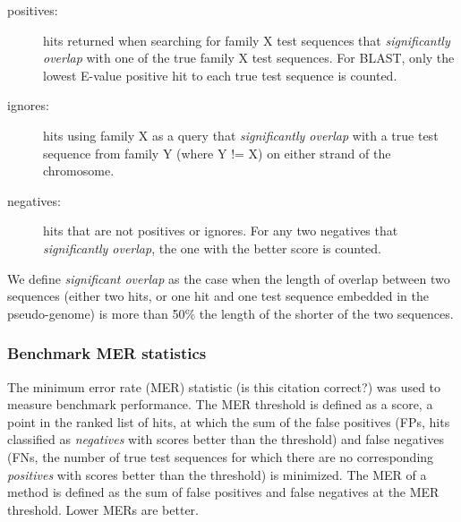 \documentclass[11pt]{article}
\begin{document}
\begin{description}
\item[positives:]
  hits returned when searching for family X test sequences
  that \emph{significantly overlap}
  with one of the true family X test sequences. For \textsc{BLAST}, only the
  lowest E-value positive hit to each true test sequence is
  counted. 
\item[ignores:] 
  hits using family X as a query that \emph{significantly
    overlap} with a true test sequence
  from family Y (where Y != X) on either strand of the
  chromosome.%
\item[negatives:]
  hits that are not positives or ignores. %
  For any two negatives that \emph{significantly overlap},
  the one with the better score is counted.
\end{description}
  
We define \emph{significant overlap} as the case when 
the length of overlap between two sequences (either two hits, or one
hit and one test sequence embedded in the pseudo-genome)
is more than 50\% the length of the shorter of the two sequences.

\subsubsection{Benchmark MER statistics} 

The minimum error rate (MER) statistic \cite{Pearson95} (is this
citation correct?) was used to
measure benchmark performance. 
The MER threshold is defined as a score, a point in the ranked
list of hits, at which the sum of the false positives (FPs, hits
classified as \emph{negatives} with scores better than the threshold) and
false negatives (FNs, the number of true test sequences for which
there are no corresponding \emph{positives} with scores better than
the threshold) is minimized. The MER of a method is defined as the sum of false
positives and false negatives at the MER threshold. Lower MERs are better.
\end{document}
